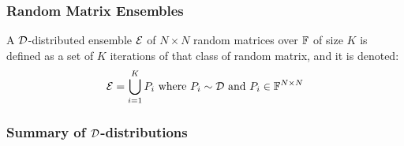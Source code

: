 \begin{frame} \frametitle{Random Matrix Ensembles}

\begin{alertblock}{}
A $\mathcal{D}$-distributed ensemble $\mathcal{E}$ of $N \times N$ random matrices over $\mathbb{F}$ of size $K$ is defined as a set of $K$ iterations of that class of random matrix, and it is denoted:
$$ \mathcal{E} = \bigcup_{i = 1}^K P_i \text{ where } P_i \sim \mathcal{D} \text{ and } P_i \in \mathbb{F}^{N \times N} $$
\end{alertblock}

\end{frame}
\begin{frame} \frametitle{Summary of $\mathcal{D}$-distributions}
  \begin{center}
    \Ddisttable
  \end{center}
\end{frame}



